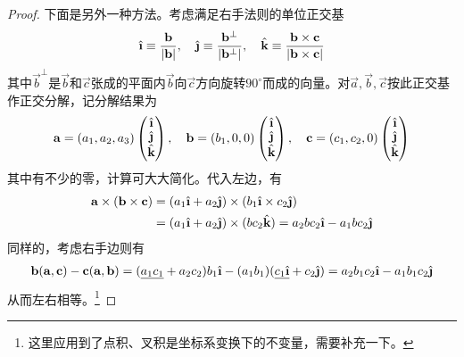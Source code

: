 \begin{proof}
  下面是另外一种方法。考虑满足右手法则的单位正交基
  \begin{align*}
    \ihat \equiv \frac{\vec b}{\left|\vec b\right|},\quad
    \jhat \equiv \frac{\vec b^\perp}{\left|\vec b^\perp\right|},\quad
    \khat \equiv \frac{\vec b\times \vec c}{\left|\vec b\times\vec c\right|}
  \end{align*}
  其中$\vec b^\perp$是$\vec b$和$\vec c$张成的平面内$\vec b$向$\vec c$方向旋转$90^\circ$而成的向量。对$\vec a,\vec b,\vec c$按此正交基作正交分解，记分解结果为
  \begin{align*}\renewcommand{\arraystretch}{.9}
    \vec a=(a_1, a_2, a_3)\begin{pmatrix}\ihat\\ \jhat\\ \khat\end{pmatrix}, \quad
    \vec b=(b_1,   0,   0)\begin{pmatrix}\ihat\\ \jhat\\ \khat\end{pmatrix}, \quad
    \vec c=(c_1, c_2,   0)\begin{pmatrix}\ihat\\ \jhat\\ \khat\end{pmatrix}
  \end{align*}
  其中有不少的零，计算可大大简化。代入左边，有
  \begin{align*}
    \vec a\times(\vec b\times\vec c) ={}& (a_1\ihat + a_2\jhat)\times(b_1\ihat \times c_2\jhat)\\
    ={}& (a_1\ihat + a_2\jhat)\times(bc_2\khat) = a_2bc_2\ihat - a_1bc_2\jhat
  \end{align*}
  同样的，考虑右手边则有
  \begin{align*}
    \vec b(\vec a,\vec c) - \vec c(\vec a,\vec b) = (\underline{a_1c_1} + a_2c_2) b_1\ihat  - (a_1b_1)(\underline{c_1\ihat} + c_2\jhat)
    =a_2b_1c_2\ihat - a_1b_1c_2\jhat
  \end{align*}
  从而左右相等。\footnote{这里应用到了点积、叉积是坐标系变换下的不变量，需要补充一下。}
\end{proof}

